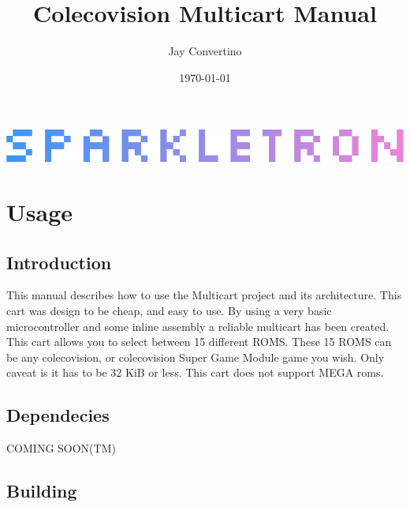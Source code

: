 \documentclass{article}
\title{{\Huge Colecovision Multicart Manual}}
\author{\Large Jay Convertino}
\date{\today}
\begin{document}
  \begin{titlepage}
    \begin{center}

    \thetitle

    \vspace{25mm}

    \includegraphics[width=\textwidth,height=\textheight,keepaspectratio]{src/img/sparkletron.png}

    \vspace{25mm}

    \thedate

    \vspace{15mm}

    \theauthor

    \end{center}
  \end{titlepage}

  \tableofcontents

  \newpage

  \section{Usage}

  \subsection{Introduction}

  \par
  This manual describes how to use the Multicart project and its architecture. This cart was design to be cheap, and easy to use.
  By using a very basic microcontroller and some inline assembly a reliable multicart has been created. This cart allows you to
  select between 15 different ROMS. These 15 ROMS can be any colecovision, or colecovision Super Game Module game you wish. Only
  caveat is it has to be 32 KiB or less. This cart does not support MEGA roms.

  \subsection{Dependecies}

  \par
  COMING SOON(TM)

  \subsection{Building}
\end{document}

